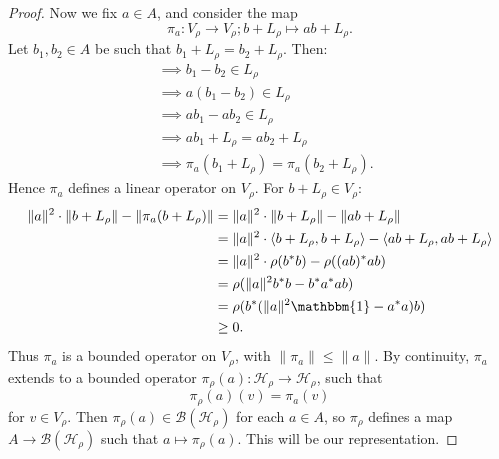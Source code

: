 \documentclass[12pt,a4paper]{report}
\theoremstyle{plain}
\theoremstyle{definition}
\newcommand{\1}{\mathbbm{1}}
\newcommand{\B}{\mathcal{B}}
\newcommand{\Hr}{\mathcal{H}_\rho}
\newcommand{\Vr}{V_\rho}
\begin{document}
\begin{proof}
	Now we fix $a \in A$, and consider the map 
	\[
		\pi_a : V_\rho \to V_\rho; b+L_\rho \mapsto ab+L_\rho.
	\]
	Let $b_1, b_2 \in A$ be such that $b_1+L_\rho = b_2+L_\rho$. Then:
	\begin{align*}
		&\implies	b_1-b_2 \in L_\rho										\\	
		&\implies	a(b_1-b_2) \in L_\rho									\\	
		&\implies	ab_1-ab_2 \in L_\rho									\\	
		&\implies	ab_1 + L_\rho = ab_2+L_\rho								\\	
		&\implies	\pi_a(b_1+L_\rho) = \pi_a(b_2+L_\rho).
	\end{align*}
	Hence $\pi_a$ defines a linear operator on $V_\rho$.
	For $b+L_\rho \in V_\rho$:
	\begin{align*}
				\|a\|^2 \cdot \|b+L_\rho\| - \| \pi_a(b+L_\rho) \|
		&=		\|a\|^2 \cdot \|b+L_\rho\| - \| ab+L_\rho \|				\\
		&=		\|a\|^2 \cdot \langle b+L_\rho,b+L_\rho \rangle - 
									\langle ab+L_\rho,ab+L_\rho \rangle		\\
		&=		\|a\|^2 \cdot \rho(b^\ast b) - \rho ((ab)^\ast ab)			\\
		&= 		\rho (\|a\|^2 b^\ast b-b^\ast a^\ast ab)					\\
		&=		\rho (b^\ast (\|a\|^{2} \mathbbm{1} - a ^\ast a)b)			\\
		&\geq 	0.
	\end{align*}
	Thus $\pi_a$ is a bounded operator on $\Vr$, with $\|\pi_a\| \leq \|a\|$. By continuity,
	$\pi_a$ extends to a bounded operator $\pi_\rho(a):\Hr \to \Hr$,
	such that \[ \pi_\rho(a)(v) = \pi_a(v) \] for $v\in \Vr$. 
	Then $\pi_\rho(a) \in \B(\Hr)$ for each $a \in A$, so $\pi_\rho$ defines a map 
	$A \to \B(\Hr)$ such that $ a \mapsto \pi_\rho(a)$. This will be our representation.
	

\end{proof}
\end{document}
